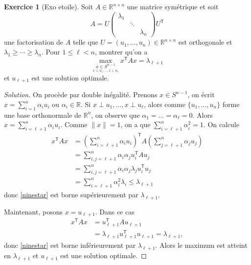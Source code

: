 \documentclass[a4paper,12pt,french]{report}
\theoremstyle{plain}
\theoremstyle{definition}
\newtheorem{exercise}{Exercice}[chapter]
\begin{document}
\begin{exercise}[Exo etoile]
Soit $A\in \mathbb{R}^{n\times n}$ une matrice symétrique et soit
$$
A=U\begin{pmatrix}
\lambda_{1} &  &  \\
 & \ddots &  \\
 &  & \lambda _{n} 
\end{pmatrix}U^{\mathsf{T}}
$$
une factorisation de $A$ telle que $U=(u_{1},\dots,u_{n})\in \mathbb{R}^{n\times n}$ est orthogonale et $\lambda_{1}\ge\cdots\ge\lambda _{n}$. Pour $1\le\ell<n$, montrer qu'on a 
\begin{equation}
\max_{\underset{x\perp u_{1},\dots,x\perp u_{\ell}}{x \in S^{n-1}}}x^{\mathsf{T}}Ax=\lambda _{\ell +1} \label{ninestar}
\end{equation}
et $u_{\ell +1}$ est une solution optimale.
\end{exercise}
\begin{proof}[Solution]
On procède par double inégalité. Prenons $x \in S^{n-1}$, on écrit $x=\sum _{i=1}^{n}\alpha _{i}u_{i}$ ou $\alpha _{i}\in \mathbb{R}$. Si $x\perp u_{1},\dots,x\perp u_{\ell}$, alors comme $\{ u_{1},\dots,u_{n} \}$ forme une base orthonormale de $\mathbb{R}^{n}$, on observe que $\alpha_{1}=\dots=\alpha _{\ell}=0$. Alors $x=\sum_{i=\ell +1}^{n}\alpha _{i}u_{i}$. Comme $\lVert x \rVert=1$, on a que $\sum_{i=\ell +1}^{n}\alpha _{i}^{2}=1$. On calcule
\begin{align*}
x^{\mathsf{T}}Ax & =\left( \sum_{i=\ell +1}^{n} \alpha _{i}u_{i} \right)^{\mathsf{T}}A\left( \sum_{j=\ell +1}^{n} \alpha _{j}u_{j} \right) \\
 & =\sum _{i,j=\ell +1}^{n}\alpha _{i}\alpha _{j}u_{i}^{\mathsf{T}}Au_{j} \\
 & =\sum_{i,j=\ell +1}^{n}\alpha _{i}\alpha _{j}\lambda _{j}u_{i}^{\mathsf{T}}u_{j} \\
 & =\sum_{i=\ell +1}^{n} \alpha _{i}^{2}\lambda _{i}\le \lambda _{\ell +1}
\end{align*}
donc \ref{ninestar} est borne supérieurement par $\lambda _{\ell +1}$.

Maintenant, posons $x=u_{\ell +1}$. Dans ce cas 
\begin{align*}
x^{\mathsf{T}}Ax & =u_{\ell +1}^{\mathsf{T}}Au_{\ell +1} \\  & =\lambda _{\ell +1}u_{\ell +1}^{\mathsf{T}}u_{\ell +1} =\lambda _{\ell +1},
\end{align*}
donc \ref{ninestar} est borne inférieurement par $\lambda _{\ell +1}$. Alors le maximum est atteint en $\lambda _{\ell +1}$ et $u_{\ell +1}$ est une solution optimale.
\end{proof}
\end{document}
